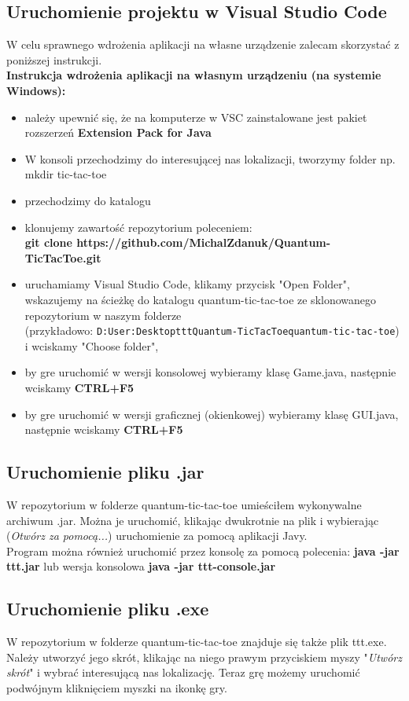 \documentclass{article}
\begin{document}
\subsection{Uruchomienie projektu w Visual Studio Code}
W celu sprawnego wdrożenia aplikacji na własne urządzenie zalecam skorzystać z poniższej instrukcji.\\
\textbf{Instrukcja wdrożenia aplikacji na własnym urządzeniu (na systemie Windows):}
\begin{itemize}
    \item należy upewnić się, że na komputerze w VSC zainstalowane jest pakiet rozszerzeń \textbf{Extension Pack for Java}
    \item W konsoli przechodzimy do interesującej nas lokalizacji, tworzymy folder np. mkdir tic-tac-toe
    \item przechodzimy do katalogu
    \item klonujemy zawartość repozytorium poleceniem:\\
    \textbf{git clone https://github.com/MichalZdanuk/Quantum-TicTacToe.git}
    \item uruchamiamy Visual Studio Code, klikamy przycisk "Open Folder", wskazujemy na ścieżkę do katalogu quantum-tic-tac-toe ze sklonowanego repozytorium w naszym folderze\\
    (przykładowo: \texttt{D:\BS User:\BS Desktop\BS ttt\BS Quantum-TicTacToe\BS quantum-tic-tac-toe}) i wciskamy "Choose folder",
    \item by gre uruchomić w wersji konsolowej wybieramy klasę Game.java, następnie wciskamy \textbf{CTRL+F5}
    \item by gre uruchomić w wersji graficznej (okienkowej) wybieramy klasę GUI.java, następnie wciskamy \textbf{CTRL+F5}
\end{itemize}

\subsection{Uruchomienie pliku .jar}
W repozytorium w folderze quantum-tic-tac-toe umieściłem wykonywalne archiwum .jar. Można je uruchomić, klikając dwukrotnie na plik i wybierając (\emph{Otwórz za pomocą...}) uruchomienie za pomocą aplikacji Javy.\\
Program można również uruchomić przez konsolę za pomocą polecenia: \textbf{java -jar ttt.jar} lub wersja konsolowa \textbf{java -jar ttt-console.jar}

\subsection{Uruchomienie pliku .exe}
W repozytorium w folderze quantum-tic-tac-toe znajduje się także plik ttt.exe. Należy utworzyć jego skrót, klikając na niego prawym przyciskiem myszy "\emph{Utwórz skrót}" i wybrać interesującą nas lokalizację. Teraz grę możemy uruchomić podwójnym kliknięciem myszki na ikonkę gry.
\end{document}
